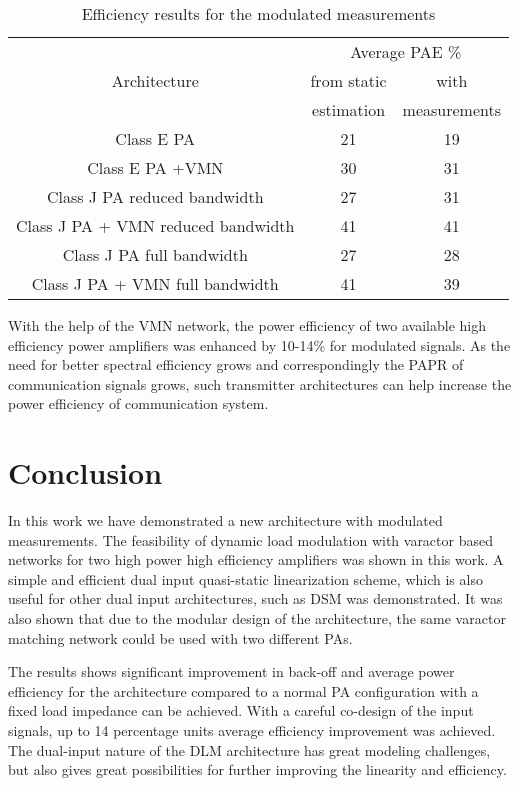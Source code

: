 \documentclass[10pt,journal]{IEEEtran}
\begin{document}
\begin{table}
\centering
\caption{Efficiency results for the modulated measurements}
\begin{tabular}{c|c|c}

& \multicolumn{2}{c}{Average PAE \%}\\
   Architecture&from static& with\\
   &estimation&measurements\\
   \hline
   \hline
   Class E PA&21&19\\
   Class E PA +VMN & 30&31\\
   \hline
   Class J PA reduced bandwidth&27&31\\
   Class J PA + VMN reduced bandwidth&41&41\\
   \hline
   Class J PA full bandwidth&27&28\\
   Class J PA + VMN full bandwidth&41&39\\
   \end{tabular}
   \label{results}
\end{table}

With the help of the VMN network, the power efficiency of two available high efficiency power amplifiers was enhanced by 10-14\% for modulated signals. As the need for better spectral efficiency grows and correspondingly the PAPR of communication signals grows, such transmitter architectures can help increase the power efficiency of communication system.

\section{Conclusion}

In this work we have demonstrated a new architecture with modulated measurements. The feasibility of dynamic load modulation with varactor based networks for two high power high efficiency amplifiers was shown in this work. A simple and efficient dual input quasi-static linearization scheme, which is also useful for other dual input architectures, such as DSM was demonstrated. It was also shown that due to the modular design of the architecture, the same varactor matching network could be used with two different PAs.

The results shows significant improvement in back-off and average power efficiency for the architecture compared to a normal PA configuration with a fixed  load impedance can be achieved. With a careful co-design of the input signals, up to 14 percentage units average efficiency improvement was achieved. The dual-input nature of the DLM architecture has great modeling challenges, but also gives great possibilities for further improving the linearity and efficiency.





\end{document}
